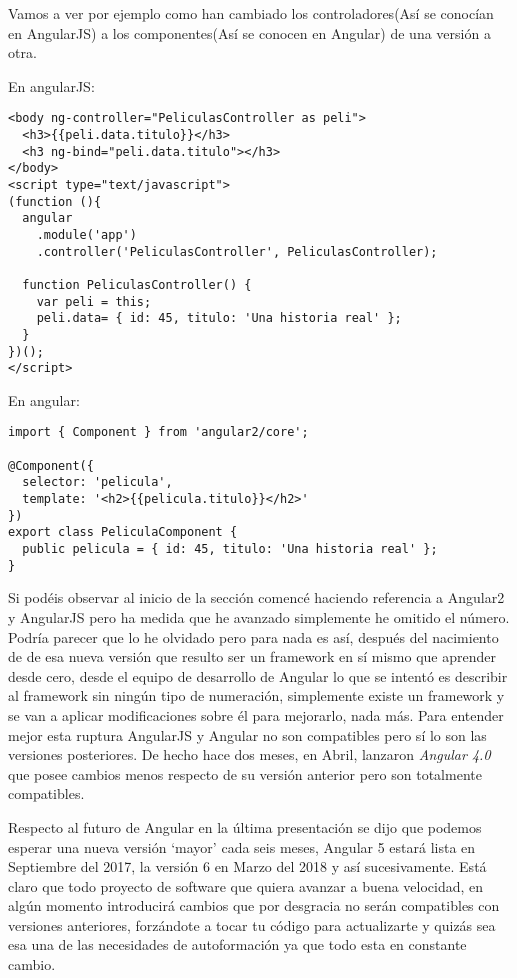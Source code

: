  Vamos a ver por ejemplo como han cambiado los controladores(Así se conocían en AngularJS) a los componentes(Así se conocen en Angular) de una versión a otra.
 
 En angularJS:
 
 \lstset{breaklines=true, basicstyle=\footnotesize}
\begin{lstlisting}[frame=single]
<body ng-controller="PeliculasController as peli">  
  <h3>{{peli.data.titulo}}</h3>
  <h3 ng-bind="peli.data.titulo"></h3>
</body>  
<script type="text/javascript">  
(function (){
  angular
    .module('app')
    .controller('PeliculasController', PeliculasController);
 
  function PeliculasController() {
    var peli = this;
    peli.data= { id: 45, titulo: 'Una historia real' };
  }
})();
</script> 
\end{lstlisting}

En angular:
 \lstset{breaklines=true, basicstyle=\footnotesize}
\begin{lstlisting}[frame=single]
import { Component } from 'angular2/core';
 
@Component({
  selector: 'pelicula',
  template: '<h2>{{pelicula.titulo}}</h2>'
})
export class PeliculaComponent {  
  public pelicula = { id: 45, titulo: 'Una historia real' };
}
\end{lstlisting}

Si podéis observar al inicio de la sección comencé haciendo referencia a Angular2 y AngularJS pero ha medida que he avanzado simplemente he omitido el número. Podría parecer que lo he olvidado pero para nada es así, después del nacimiento de de esa nueva versión que resulto ser un framework en sí mismo que aprender desde cero, desde el equipo de desarrollo de Angular lo que se intentó es describir al framework sin ningún tipo de numeración, simplemente existe un framework y se van a aplicar modificaciones sobre él para mejorarlo, nada más. Para entender mejor esta ruptura AngularJS y Angular no son compatibles pero sí lo son las versiones posteriores. De hecho hace dos meses, en Abril, lanzaron  \emph{Angular  4.0 }   que posee cambios menos respecto de su versión anterior pero son totalmente compatibles.




Respecto al futuro de Angular en la última presentación se dijo  que podemos esperar una nueva versión ‘mayor’ cada seis meses, Angular 5 estará lista en Septiembre del 2017, la versión 6 en Marzo del 2018 y así sucesivamente. Está claro que todo proyecto de software que quiera avanzar a buena velocidad, en algún momento introducirá cambios que por desgracia no serán compatibles con versiones anteriores, forzándote a tocar tu código para actualizarte y quizás sea esa una de las necesidades de autoformación ya que todo esta en constante cambio. 

